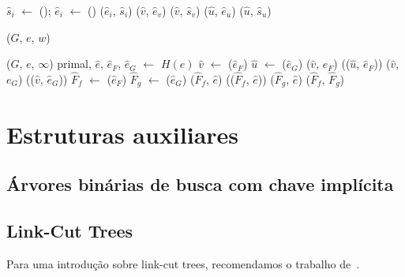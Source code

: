 \begin{algorithm}[htb]
\caption{\MSFaddEdge($v$, $e_v$, $u$, $e_u$)}
\label{Algo:MSFaddEdge}
\begin{algorithmic}[1]


\State $\hat s_i$ $\gets$ \LCOMakeNode(); $\hat e_i$ $\gets$ \LCOMakeNode()
\State \LCOLink($\hat e_i$, $\hat s_i$)
\EndFor
\State \LCOCycle($\hat v$, $\hat e_v$)
\State \LCOMerge($\hat v$, $\hat s_v$)
\State \LCOCycle($\hat u$, $\hat e_u$)
\State \LCOMerge($\hat u$, $\hat s_u$)
\State
\State 




\State \MSFupdate($G$, $e$, $w$)
\end{algorithmic}
\end{algorithm}


\begin{algorithm}[htb]
\caption{\MSFdelEdge($G$, $e$)}
\label{Algo:MSFdelEdge}
\begin{algorithmic}[1]
\State \MSFupdate($G$, $e$, $\infty$)
\State primal, $\hat e$, $\hat e_F$, $\hat e_G$ $\gets$ $H(e)$
\State $\hat v$ $\gets$ \LCOParent($\hat e_F$)
\State $\hat u$ $\gets$ \LCOParent($\hat e_G$)
\State \LCOCycle($\hat v$, $e_F$)
\State \LCOSplit(\LCOPredecessor($\hat u$, $\hat e_F$))
\State \LCOCycle($\hat v$, $e_G$)
\State \LCOSplit(\LCOPredecessor($\hat v$, $\hat e_G$))
\State
\State $\hat F_f$ $\gets$ \LCOLeftFace($\hat e_F$)
\State $\hat F_g$ $\gets$ \LCOLeftFace($\hat e_G$)
\State \LCOCycle($\hat F_f$, $\hat e$)
\State \LCOSplit(\LCOPredecessor($\hat F_f$, $\hat e$))
\State \LCOCycle($\hat F_g$, $\hat e$)
\State
\State \LCOMerge($\hat F_f$, $\hat F_g$)
\end{algorithmic}
\end{algorithm}

\section{Estruturas auxiliares}
\subsection{Árvores binárias de busca com chave implícita}
\subsection{Link-Cut Trees}
\label{sec:linkcuttree}

Para uma introdução sobre link-cut trees, recomendamos o trabalho de~\cite{linkcuttree}.

